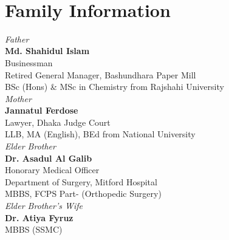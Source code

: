 \documentclass[a4paper,12pt]{article}
\begin{document}
\\
\begin{minipage}[t][12cm]{\textwidth}
\section*{Family Information}
\raggedright
{\itshape Father}\\{\large \bfseries Md. Shahidul Islam}\\ Businessman \\
Retired General Manager, Bashundhara Paper Mill \\
BSc (Hons) \& MSc in Chemistry from Rajshahi University \vspace{4mm}\\
{\itshape Mother}\\{\large \bfseries Jannatul Ferdose}\\ Lawyer, Dhaka Judge Court \\
LLB, MA (English), BEd from National University \vspace{4mm}\\
{\itshape Elder Brother}\\{\large \bfseries Dr. Asadul Al Galib}\\
Honorary Medical Officer \\
Department of Surgery, Mitford Hospital \\
MBBS, FCPS Part-{} (Orthopedic Surgery) \vspace{4mm}\\
{\itshape Elder Brother's Wife}\\{\large \bfseries Dr. Atiya Fyruz}\\ MBBS (SSMC) \vspace{2mm}\\
\end{minipage}
\end{document}
